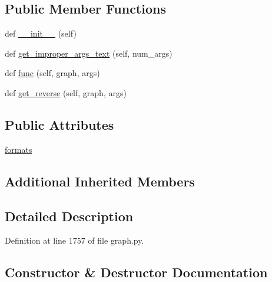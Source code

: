 \subsection*{Public Member Functions}
\begin{DoxyCompactItemize}
\item 
def \hyperlink{classlight__chats_1_1graph_1_1LockFunction_a3b0ae63ba1342ce53d664a879f040f7a}{\+\_\+\+\_\+init\+\_\+\+\_\+} (self)
\item 
def \hyperlink{classlight__chats_1_1graph_1_1LockFunction_a816faf6314525be44d40024fd83d72d8}{get\+\_\+improper\+\_\+args\+\_\+text} (self, num\+\_\+args)
\item 
def \hyperlink{classlight__chats_1_1graph_1_1LockFunction_afdb92aaa380487d44d27381bd168240a}{func} (self, graph, args)
\item 
def \hyperlink{classlight__chats_1_1graph_1_1LockFunction_a90dd7a90a271b6d2f27b17f6796daa91}{get\+\_\+reverse} (self, graph, args)
\end{DoxyCompactItemize}
\subsection*{Public Attributes}
\begin{DoxyCompactItemize}
\item 
\hyperlink{classlight__chats_1_1graph_1_1LockFunction_a5a4e9e70cf33889e84cc3d713cb3a270}{formats}
\end{DoxyCompactItemize}
\subsection*{Additional Inherited Members}


\subsection{Detailed Description}
\begin{DoxyVerb}\end{DoxyVerb}
 

Definition at line 1757 of file graph.\+py.



\subsection{Constructor \& Destructor Documentation}
\mbox{\label{classlight__chats_1_1graph_1_1LockFunction_a3b0ae63ba1342ce53d664a879f040f7a}} 
